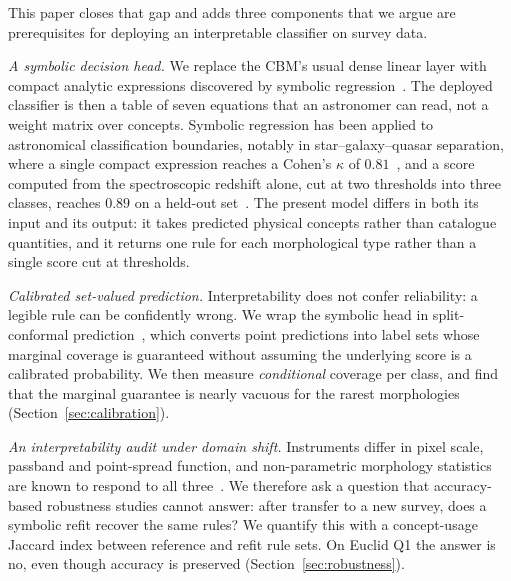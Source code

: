 \documentclass[11pt]{article}
\begin{document}
This paper closes that gap and adds three components that we argue are
prerequisites for deploying an interpretable classifier on survey data.

\emph{A symbolic decision head.} We replace the CBM's usual dense linear
layer with compact analytic expressions discovered by symbolic
regression~\citep{cranmer2023}. The deployed classifier is then a table of
seven equations that an astronomer can read, not a weight matrix over concepts.
Symbolic regression has been applied to astronomical classification boundaries,
notably in star--galaxy--quasar separation, where a single compact expression
reaches a Cohen's $\kappa$ of $0.81$~\citep{llorella2025}, and a score computed
from the spectroscopic redshift alone, cut at two thresholds into three
classes, reaches $0.89$ on a held-out set~\citep{deshpande2026}. The present
model differs in both its input and its output: it takes predicted physical
concepts rather than catalogue quantities, and it returns one rule for each
morphological type rather than a single score cut at thresholds.

\emph{Calibrated set-valued prediction.} Interpretability does not confer
reliability: a legible rule can be confidently wrong. We wrap the symbolic
head in split-conformal prediction~\citep{vovk2005,angelopoulos2023}, which
converts point predictions into label sets whose marginal coverage is
guaranteed without assuming the underlying score is a calibrated probability.
We then measure \emph{conditional} coverage per class, and find that the
marginal guarantee is nearly vacuous for the rarest morphologies
(Section~\ref{sec:calibration}).

\emph{An interpretability audit under domain shift.} Instruments differ in
pixel scale, passband and point-spread function, and non-parametric morphology
statistics are known to respond to all three~\citep{ferrari2015}. We therefore
ask a question that accuracy-based robustness studies cannot answer: after
transfer to a new survey, does a symbolic refit recover the same rules? We
quantify this with a concept-usage Jaccard index between reference and refit
rule sets. On Euclid Q1 the answer is no, even though accuracy is preserved
(Section~\ref{sec:robustness}).
\end{document}
